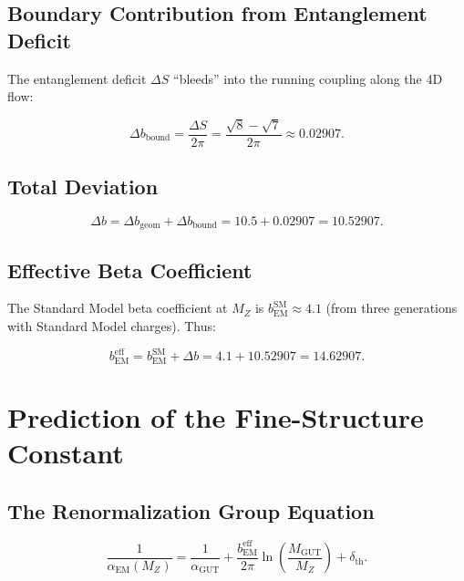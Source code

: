 \documentclass[12pt]{article}
\begin{document}
\subsection{Boundary Contribution from Entanglement Deficit}

The entanglement deficit \(\Delta S\) ``bleeds'' into the running coupling along the 4D flow:

\begin{equation}
\Delta b_{\text{bound}} = \frac{\Delta S}{2\pi} = \frac{\sqrt{8} - \sqrt{7}}{2\pi} \approx 0.02907 .
\label{eq:deltab_bound}
\end{equation}

\subsection{Total Deviation}

\begin{equation}
\boxed{\Delta b = \Delta b_{\text{geom}} + \Delta b_{\text{bound}} = 10.5 + 0.02907 = 10.52907 .}
\label{eq:deltab_total}
\end{equation}

\subsection{Effective Beta Coefficient}

The Standard Model beta coefficient at \(M_Z\) is \(b_{\text{EM}}^{\text{SM}} \approx 4.1\) (from three generations with Standard Model charges). Thus:

\begin{equation}
\boxed{b_{\text{EM}}^{\text{eff}} = b_{\text{EM}}^{\text{SM}} + \Delta b = 4.1 + 10.52907 = 14.62907 .}
\label{eq:bem_eff}
\end{equation}

\section{Prediction of the Fine-Structure Constant}

\subsection{The Renormalization Group Equation}

\begin{equation}
\frac{1}{\alpha_{\text{EM}}(M_Z)} = \frac{1}{\alpha_{\text{GUT}}} + \frac{b_{\text{EM}}^{\text{eff}}}{2\pi} \ln\left(\frac{M_{\text{GUT}}}{M_Z}\right) + \delta_{\text{th}} .
\label{eq:rge}
\end{equation}
\end{document}
